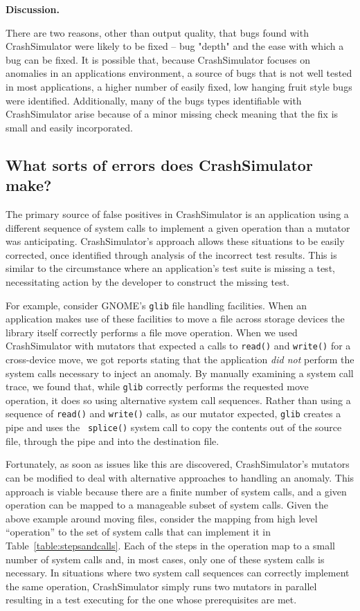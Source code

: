 {\bf Discussion. }

There are two reasons, other than output quality, that bugs found with
CrashSimulator were likely to be fixed -- bug "depth" and the ease
with which a bug can be fixed.
It is possible that, because CrashSimulator
focuses on anomalies in an applications environment, a source of bugs that
is not well tested in most applications, a higher number of easily fixed,
low
hanging fruit style bugs were identified.
Additionally, many of the bugs types identifiable with CrashSimulator arise
because of a minor missing check meaning that the fix is small and easily
incorporated.

\subsection{What sorts of errors does CrashSimulator make?}
\label{sec-sorts-errors}

The primary source of false positives in CrashSimulator is an application
using a different sequence of system calls to implement a given operation
than a mutator was anticipating. CrashSimulator's approach allows these
situations to be easily corrected, once identified through analysis of the
incorrect test results.  This is similar to the circumstance where an
application's test suite is missing a test, necessitating action by the
developer to construct the missing test.

For example, consider GNOME's {\tt glib} file handling facilities.  When an
application makes use of these facilities to move a file across storage
devices the library itself correctly performs a
file move operation.  When we used CrashSimulator with
mutators that expected a calls to {\tt read()} and {\tt write()}
for a cross-device move, we got reports stating that the
application {\em did not} perform the system calls necessary to inject
an anomaly.  By manually
examining a system call trace, we found that, while {\tt glib} correctly
performs the requested move operation,
it does so using alternative system call
sequences.  Rather than using a sequence of {\tt read()} and {\tt write()}
calls, as our mutator expected, {\tt glib} creates a pipe and uses the {\tt
splice()} system call to copy the contents out of the source file, through
the pipe and into the destination file.

Fortunately, as soon as issues like this are discovered,
CrashSimulator's mutators can be modified to deal with alternative
approaches to handling an anomaly.  This approach is viable because there
are a finite number of system calls, and a given operation can be mapped to
a manageable subset of system calls.  Given the above example around moving
files, consider the mapping from high level ``operation'' to the set of
system calls that can implement it in Table~\ref{table:stepsandcalls}.
Each of the steps in the operation map to a small number of system calls
and, in most cases, only one of these system calls is necessary.  In
situations where two system call sequences can correctly implement the same
operation, CrashSimulator simply runs two mutators in parallel resulting in a
test executing for the one whose prerequisites are met.


